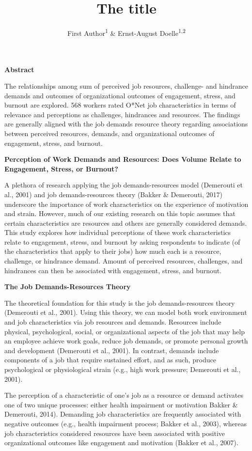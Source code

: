 \documentclass[
  man]{apa6}
\title{The title}
\author{First Author\textsuperscript{1} \& Ernst-August Doelle\textsuperscript{1,2}}
\date{}
\affiliation{\vspace{0.5cm}\textsuperscript{1} Wilhelm-Wundt-University\\\textsuperscript{2} Konstanz Business School}
\begin{document}
\maketitle

\textbf{Abstract}

The relationships among sum of perceived job resources, challenge- and hindrance demands and outcomes of organizational outcomes of engagement, stress, and burnout are explored. 568 workers rated O*Net job characteristics in terms of relevance and perceptions as challenges, hindrances and resources. The findings are generally aligned with the job demands resource theory regarding associations between perceived resources, demands, and organizational outcomes of engagement, stress, and burnout.

\textbf{Perception of Work Demands and Resources: Does Volume Relate to Engagement, Stress, or Burnout?}

A plethora of research applying the job demands-resources model (Demerouti et al., 2001) and job demands-resources theory (Bakker \& Demerouti, 2017) underscore the importance of work characteristics on the experience of motivation and strain. However, much of our existing research on this topic assumes that certain characteristics are resources and others are generally considered demands. This study explores how individual perceptions of these work characteristics relate to engagement, stress, and burnout by asking respondents to indicate (of the characteristics that apply to their jobs) how much each is a resource, challenge, or hindrance demand. Amount of perceived resources, challenges, and hindrances can then be associated with engagement, stress, and burnout.

\textbf{The Job Demands-Resources Theory}

The theoretical foundation for this study is the job demands-resources theory (Demerouti et al., 2001). Using this theory, we can model both work environment and job characteristics via job resources and demands. Resources include physical, psychological, social, or organizational aspects of the job that may help an employee achieve work goals, reduce job demands, or promote personal growth and development (Demerouti et al., 2001). In contrast, demands include components of a job that require sustained effort, and as such, produce psychological or physiological strain (e.g., high work pressure; Demerouti et al., 2001).

The perception of a characteristic of one's job as a resource or demand activates one of two unique processes: either health impairment or motivation Bakker \& Demerouti, 2014). Demanding job characteristics are frequently associated with negative outcomes (e.g., health impairment process; Bakker et al., 2003), whereas job characteristics considered resources have been associated with positive organizational outcomes like engagement and motivation (Bakker et al., 2007).
\end{document}
